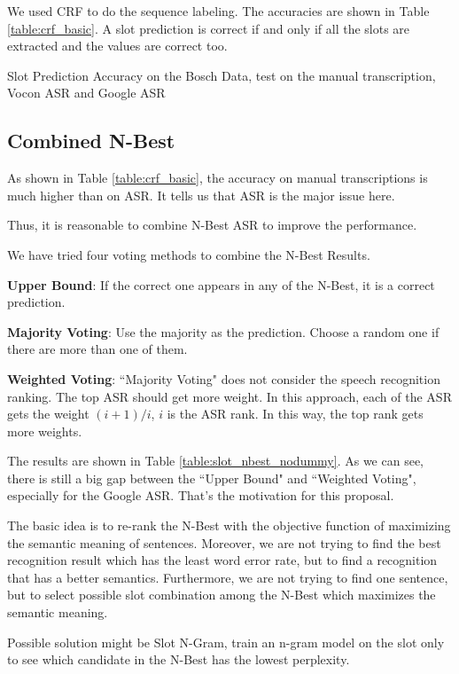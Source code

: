 \documentclass[11pt,letterpaper]{article}
\begin{document}
We used CRF \cite{Lafferty:2001} to do the sequence labeling. The accuracies are shown in Table \ref{table:crf_basic}. A slot prediction is correct if and only if all the slots are extracted and the values are correct too.

\begin{table}[!htb] 
\centering 
 
\caption{Slot Prediction Accuracy on the Bosch Data, test on the manual transcription, Vocon ASR and Google ASR} 
\label{table:crf_basic} 
\end{table} 

\subsection{Combined N-Best}
As shown in Table \ref{table:crf_basic}, the accuracy on manual transcriptions is much higher than on ASR. It tells us that ASR is the major issue here.

Thus, it is reasonable to combine N-Best ASR to improve the performance.

We have tried four voting methods to combine the N-Best Results.
 
{\bf Upper Bound}: 
If the correct one appears in any of the N-Best, it is a correct prediction. 
 
{\bf Majority Voting}: 
Use the majority as the prediction. Choose a random one if there are more than one of them. 
 
{\bf Weighted Voting}: 
``Majority Voting" does not consider the speech recognition ranking. The top ASR should get more weight. In this approach, each of the ASR gets the weight $(i+1)/i$, $i$ is the ASR rank. In this way, the top rank gets more weights.

The results are shown in Table \ref{table:slot_nbest_nodummy}. As we can see, there is still a big gap between the ``Upper Bound" and ``Weighted Voting", especially for the Google ASR. That's the motivation for this proposal.

The basic idea is to re-rank the N-Best with the objective function of maximizing the semantic meaning of sentences. Moreover, we are not trying to find the best recognition result which has the least word error rate, but to find a recognition that has a better semantics. Furthermore, we are not trying to find one sentence, but to select possible slot combination among the N-Best which maximizes the semantic meaning.

Possible solution might be Slot N-Gram, train an n-gram model on the slot only to see which candidate in the N-Best has the lowest perplexity.
\end{document}
